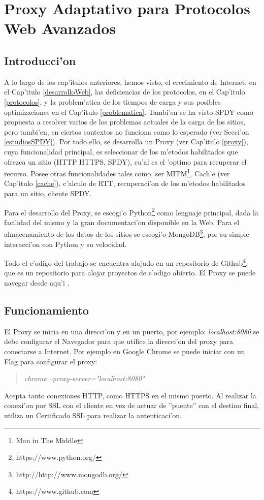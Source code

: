 \chapter{Proxy Adaptativo para Protocolos Web Avanzados}
\label{spdyproxypython}

\section{Introducci'on}

A lo largo de los cap'itulos anteriores, hemos visto, el crecimiento de Internet, en el Cap'itulo \ref{desarrolloWeb}, las deficiencias de los protocolos, en el Cap'itulo \ref{protocolos}, y la problem'atica de los tiempos de carga y sus posibles optimizaciones en el Cap'itulo \ref{problematica}. Tambi'en se ha visto SPDY como propuesta a resolver varios de los problemas actuales de la carga de los sitios, pero tambi'en, en ciertos contextos no funciona como lo esperado (ver Secci'on \ref{estudiosSPDY}). Por todo ello, se desarrolla un Proxy (ver Cap'itulo \ref{proxy}), cuya funcionalidad principal, es seleccionar de los m'etodos habilitados que ofrezca un sitio (HTTP HTTPS, SPDY), cu'al es el 'optimo para recuperar el recurso. Posee otras funcionalidades tales como, ser MITM\footnote{Man in The Middle}, Cach'e (ver Cap'itulo \ref{cache}), c'alculo de RTT, recuperaci'on de los m'etodos habilitados para un sitio, cliente SPDY.

Para el desarrollo del Proxy, se escogi'o Python\footnote{https://www.python.org/} como lenguaje principal, dada la facilidad del mismo y la gran documentaci'on disponible en la Web. Para el almacenamiento de los datos de los sitios se escogi'o MongoDB\footnote{http://http://www.mongodb.org/}, por su simple interacci'on con Python y su velocidad.

Todo el c'odigo del trabajo se encuentra alojado en un repositorio de Github\footnote{https://www.github.com}, que es un repositorio para alojar proyectos de c'odigo abierto. El Proxy se puede navegar desde aqu'i \citep{spdyproxypython}.

\section{Funcionamiento}

El Proxy se inicia en una direcci'on y en un puerto, por ejemplo: \textit{localhost:8080} se debe configurar el Navegador para que utilice la direcci'on del proxy para conectarse a Internet. Por ejemplo en Google Chrome se puede iniciar con un Flag para configurar el proxy:
\begin{quote}
\textit{chrome --proxy-server="localhost:8080"}
\end{quote}
Acepta tanto conexiones HTTP, como HTTPS en el mismo puerto. Al realizar la conexi'on por SSL con el cliente en vez de actuar de ''puente'' con el destino final, utiliza un Certificado SSL para realizar la autenticaci'on.

